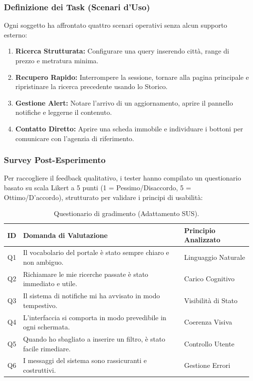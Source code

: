 \documentclass{article}
\begin{document}
\subsubsection{Definizione dei Task (Scenari d'Uso)}
Ogni soggetto ha affrontato quattro scenari operativi senza alcun supporto esterno:
\begin{enumerate}
    \item [Task 1] \textbf{Ricerca Strutturata:} Configurare una query inserendo città, range di prezzo e metratura minima.
    \item [Task 2] \textbf{Recupero Rapido:} Interrompere la sessione, tornare alla pagina principale e ripristinare la ricerca precedente usando lo Storico.
    \item [Task 3] \textbf{Gestione Alert:} Notare l'arrivo di un aggiornamento, aprire il pannello notifiche e leggerne il contenuto.
    \item [Task 4] \textbf{Contatto Diretto:} Aprire una scheda immobile e individuare i bottoni per comunicare con l'agenzia di riferimento.
\end{enumerate}

\subsubsection{Survey Post-Esperimento}
Per raccogliere il feedback qualitativo, i tester hanno compilato un questionario basato su scala Likert a 5 punti (1 = Pessimo/Disaccordo, 5 = Ottimo/D'accordo), strutturato per validare i principi di usabilità:

\begin{table}[h!]
    \centering
    \small
    \begin{tabularx}{\textwidth}{c X l}
        \toprule
        \textbf{ID} & \textbf{Domanda di Valutazione}                                     & \textbf{Principio Analizzato} \\
        \midrule
        Q1          & Il vocabolario del portale è stato sempre chiaro e non ambiguo.     & Linguaggio Naturale           \\
        Q2          & Richiamare le mie ricerche passate è stato immediato e utile.       & Carico Cognitivo              \\
        Q3          & Il sistema di notifiche mi ha avvisato in modo tempestivo.          & Visibilità di Stato           \\
        Q4          & L'interfaccia si comporta in modo prevedibile in ogni schermata.    & Coerenza Visiva               \\
        Q5          & Quando ho sbagliato a inserire un filtro, è stato facile rimediare. & Controllo Utente              \\
        Q6          & I messaggi del sistema sono rassicuranti e costruttivi.             & Gestione Errori               \\
        \bottomrule
    \end{tabularx}
    \caption{Questionario di gradimento (Adattamento SUS).}
    \label{tab:usability_survey}
\end{table}
\end{document}
